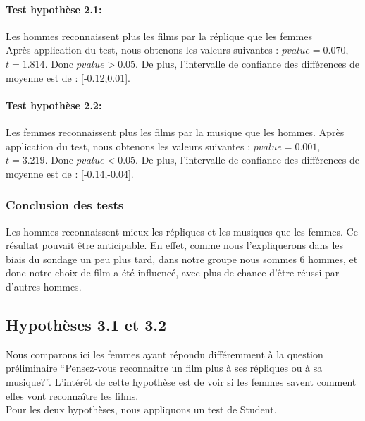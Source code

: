 \documentclass{article} %
\begin{document}
\paragraph{Test hypothèse 2.1:\\} Les hommes reconnaissent plus les films par la réplique que les femmes \\
Après application du test, nous obtenons les valeurs suivantes : $pvalue = 0.070$, $t = 1.814$. Donc ${pvalue>0.05}$. De plus, l'intervalle de confiance des différences de moyenne est de : [-0.12,0.01].
\paragraph{Test hypothèse 2.2:\\} Les femmes reconnaissent plus les films par la musique que les hommes.
Après application du test, nous obtenons les valeurs suivantes : $pvalue = 0.001$, $t = 3.219$. Donc ${pvalue<0.05}$. De plus, l'intervalle de confiance des différences de moyenne est de : [-0.14,-0.04].
\subsubsection{Conclusion des tests}
Les hommes reconnaissent mieux les répliques et les musiques que les femmes. Ce résultat pouvait être anticipable. En effet, comme nous l’expliquerons dans les biais du sondage un peu plus tard, dans notre groupe nous sommes 6 hommes, et donc notre choix de film a été influencé, avec plus de chance d’être réussi par d’autres hommes.
\subsection{Hypothèses 3.1 et 3.2}
Nous comparons ici les femmes ayant répondu différemment à la question préliminaire “Pensez-vous reconnaitre un film plus à ses répliques ou à sa musique?”. L’intérêt de cette hypothèse est de voir si les femmes savent comment elles vont reconnaître les films.\\
Pour les deux hypothèses, nous appliquons un test de Student.\\
\end{document}

